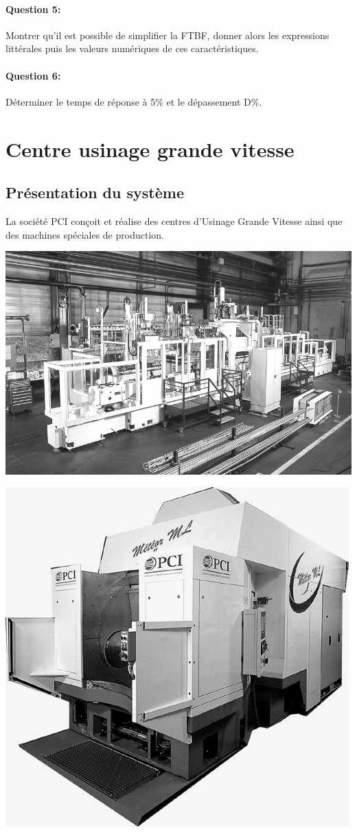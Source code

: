 \paragraph{Question 5:} Montrer qu'il est possible de simplifier la FTBF, donner alors les expressions littérales puis les valeurs numériques de ces caractéristiques.

\paragraph{Question 6:} Déterminer le temps de réponse à 5\% et le dépassement D\%.

\section{Centre usinage grande vitesse}

\subsection{Présentation du système}

La société PCI conçoit et réalise des centres d'Usinage Grande Vitesse ainsi que des machines spéciales de production.

\begin{minipage}{0.48\linewidth}
 \centering \includegraphics[width=0.6\linewidth]{img/img01}
\end{minipage}\hfill
\begin{minipage}{0.48\linewidth}
 \centering \includegraphics[width=0.6\linewidth]{img/img02}
\end{minipage}

